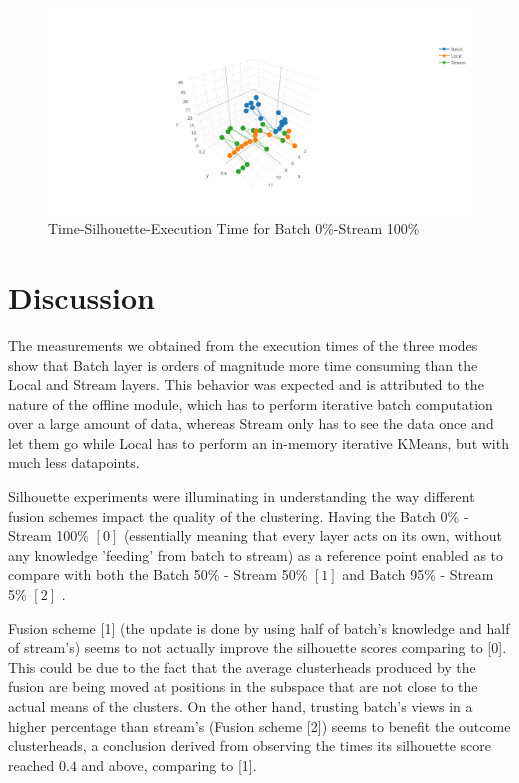 \documentclass{lmproj}
\begin{document}
\bigskip

\begin{figure}[H]
	\centering	
	\includegraphics[scale=0.5]{3d/k_5_f_0_100}
	\caption{Time-Silhouette-Execution Time for Batch 0\%-Stream 100\%}
\end{figure}



\section{Discussion}
\label{evaluation}

The measurements we obtained from the execution times of the three modes show that Batch layer is orders of magnitude more time consuming than the Local and Stream layers. This behavior was expected and is attributed to the nature of the offline module, which has to perform iterative batch computation over a large amount of data, whereas Stream only has to see the data once and let them go while Local has to perform an in-memory iterative KMeans, but with much less datapoints.

Silhouette experiments were illuminating in understanding the way different fusion schemes impact the quality of the clustering. Having the Batch 0\% - Stream 100\% $[0]$ (essentially meaning that every layer acts on its own, without any knowledge 'feeding' from batch to stream) as a reference point enabled as to compare with both the Batch 50\% - Stream 50\% $[1]$ and Batch 95\% - Stream 5\% $[2]$ .

Fusion scheme [1] (the update is done by using half of batch's knowledge and half of stream's) seems to not actually improve the silhouette scores comparing to [0]. This could be due to the fact that the average clusterheads produced by the fusion are being moved at positions in the subspace that are not close to the actual means of the clusters. On the other hand, trusting batch's views in a higher percentage than stream's  (Fusion scheme [2]) seems to benefit the outcome clusterheads, a conclusion derived from observing the times its silhouette score reached $0.4$ and above, comparing to [1].
\end{document}
